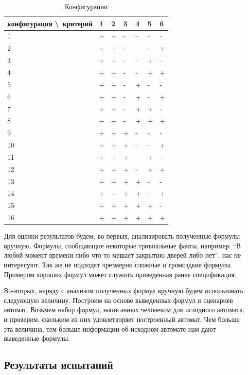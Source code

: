 \documentclass[12pt,fleqn]{article}
\begin{document}
\begin{table}
\centering
\caption{Конфигурации}
\begin{tabular}{ l | l | l | l | l | l | l }
конфигурация \textbackslash \ критерий & 1 & 2 & 3 & 4 & 5 & 6 \\
\hline
1  & + & + & - & - & - & - \\
2  & + & + & - & - & - & + \\
3  & + & + & - & - & + & - \\
4  & + & + & - & - & + & + \\
5  & + & + & - & + & - & - \\
6  & + & + & - & + & - & + \\
7  & + & + & - & + & + & - \\
8  & + & + & - & + & + & + \\
9  & + & + & + & - & - & - \\
10 & + & + & + & - & - & + \\
11 & + & + & + & - & + & - \\
12 & + & + & + & - & + & + \\
13 & + & + & + & + & - & - \\
14 & + & + & + & + & - & + \\
15 & + & + & + & + & + & - \\
16 & + & + & + & + & + & + \\
\end{tabular}
\end{table}

Для оценки результатов будем, во-первых, анализировать полученные формулы вручную. Формулы, сообщающие некоторые тривиальные
факты, например: ``В любой момент времени либо что-то мешает закрытию дверей либо нет'', нас не интересуют.
Так же не подходят чрезмерно сложные и громоздкие формулы. Примером хороших формул может служить приведенная ранее спецификация.

Во-вторых, наряду с анализом полученных формул вручную будем использовать следующую величину.
Построим на основе выведенных формул и сценариев автомат. Возьмем набор формул, написанных человеком для исходного автомата, и
проверим, скольким из них удовлетворяет построенный автомат. Чем больше эта величина, тем больше информации об исходном
автомате нам дают выведенные формулы.

\subsection{Результаты испытаний}
\end{document}
